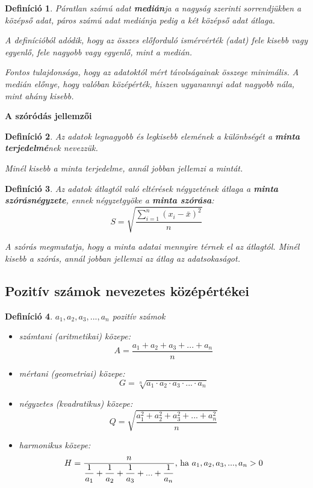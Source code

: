 \documentclass[12pt,a4paper]{article}
\newtheorem{definition}{Definíció} [section]
\begin{document}
\begin{definition}
Páratlan számú adat \textbf{medián}ja a nagyság szerinti sorrendjükben a középső adat, páros számú adat mediánja pedig a két középső adat átlaga.

A definícióból adódik, hogy az összes előforduló ismérvérték (adat) fele kisebb vagy egyenlő, fele nagyobb vagy egyenlő, mint a medián.

Fontos tulajdonsága, hogy az adatoktól mért távolságainak összege minimális.
A medián előnye, hogy valóban középérték, hiszen ugyanannyi adat nagyobb nála, mint ahány kisebb.
\end{definition}

\textbf{A szóródás jellemzői}


\begin{definition}
Az adatok legnagyobb és legkisebb elemének a különbségét a \textbf{minta terjedelmé}nek nevezzük.

Minél kisebb a minta terjedelme, annál jobban jellemzi a mintát.
\end{definition}

\begin{definition}
 Az adatok átlagtól való eltérések négyzetének átlaga a \textbf{minta szórásnégyzete}, ennek négyzetgyöke a \textbf{minta szórása}: \[S=\sqrt{\dfrac{\sum\limits_{i=1}^n(x_i-\bar{x})^2}{n}}\]

A szórás megmutatja, hogy a minta adatai mennyire térnek el az átlagtól. Minél kisebb a szórás, annál jobban jellemzi az átlag az adatsokaságot.
\end{definition}

\subsection{Pozitív számok nevezetes középértékei}

\begin{definition}
$a_1, a_2, a_3, ..., a_n$ pozitív számok
\begin{itemize}
\item számtani (aritmetikai) közepe: $$A=\dfrac{a_1+a_2+a_3+...+a_n}{n}$$
\item mértani (geometriai) közepe: $$G=\sqrt[n]{a_1\cdot a_2\cdot a_3\cdot ...\cdot a_n}$$
\item négyzetes (kvadratikus) közepe: $$Q=\sqrt{\dfrac{a_1^2+a_2^2+a_3^2+...+a_n^2}{n}}$$
\item harmonikus közepe: $$H=\dfrac{n}{\dfrac{1}{a_1}+\dfrac{1}{a_2}+\dfrac{1}{a_3}+...+\dfrac{1}{a_n}} \text{\normalfont , ha }a_1, a_2, a_3, ..., a_n>0$$
\end{itemize}
\end{definition}
\end{document}
